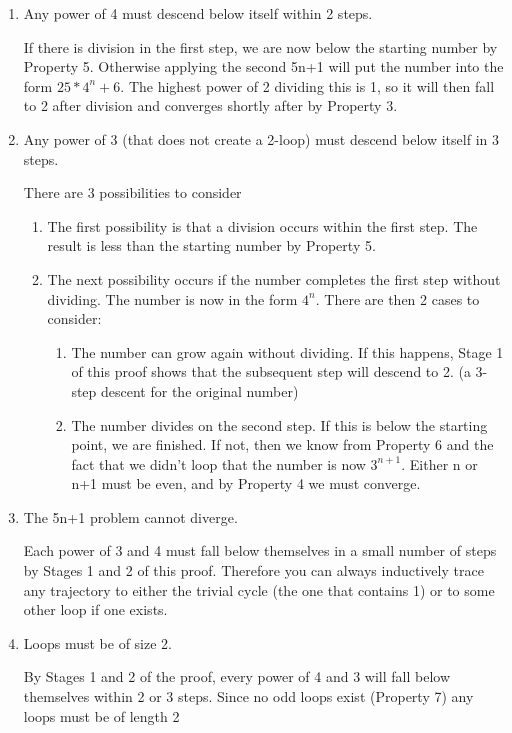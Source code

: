 \documentclass{article}
\begin{document}
\begin{enumerate}

\item Any power of 4 must descend below itself within 2 steps. 

If there is division in the first step, we are now below the starting number by Property 5. Otherwise  applying the second 5n+1 will put the number into the form $25 * 4^n +6$. The highest power of 2 dividing this is 1, so it will then fall to 2 after division and converges shortly after by Property 3.


\item Any power of 3 (that does not create a 2-loop) must descend below itself in 3 steps.

There are 3 possibilities to consider 
\begin{enumerate}
    \item The first possibility is that a division occurs within the first step. The result is less than the starting number by Property 5.
    \item The next possibility occurs if the number completes the first step without dividing. The number is now in the form $4^n$. There are then 2 cases to consider:
    \begin{enumerate}
        \item The number can grow again without dividing. If this happens, Stage 1 of this proof shows that the subsequent step will descend to 2. (a 3-step descent for the original number)
        \item The number divides on the second step. If this is below the starting point, we are finished. If not, then we know from Property 6 and the fact that we didn't loop that the number is now $3^{n+1}$. Either n or n+1 must be even, and by Property 4 we must converge.
    \end{enumerate}
\end{enumerate}


\item The 5n+1 problem cannot diverge.

Each power of 3 and 4 must fall below themselves in a small number of steps by Stages 1 and 2 of this proof. Therefore you can always inductively trace any trajectory to either the trivial cycle (the one that contains 1) or to some other loop if one exists.


\item Loops must be of size 2.

By Stages 1 and 2 of the proof, every power of 4 and 3 will fall below themselves within 2 or 3 steps. Since no odd loops exist (Property 7) any loops must be of length 2


\end{enumerate}
\end{document}
